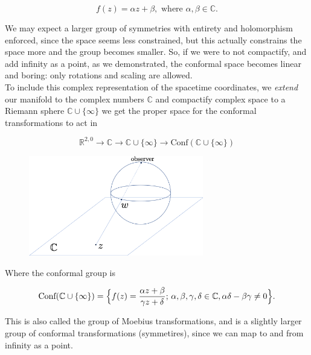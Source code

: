 \begin{equation}
f(z) = \alpha z + \beta, \text{ where } \alpha, \beta \in \mathbb{C}.
\end{equation}

\noindent We may expect a larger group of symmetries with entirety and holomorphism enforced, since the space seems less constrained, but this actually constrains the space more and the group becomes smaller. So, if we were to not compactify, and add infinity as a point, as we demonstrated, the conformal space becomes linear and boring: only rotations and scaling are allowed.\\

\noindent To include this complex representation of the spacetime coordinates, we \textit{extend} our manifold to the complex numbers $\mathbb{C}$ and compactify complex space to a Riemann sphere $\mathbb{C} \cup \{ \infty \}$ we get the proper space for the conformal transformations to act in

\begin{equation}
\mathbb{R}^{2,0} \rightarrow \mathbb{C} \rightarrow \mathbb{C} \cup \{\infty\} \rightarrow \text{Conf}(\mathbb{C} \cup \{\infty\} )
\end{equation}

\begin{figure}[H]
	\centering
	\includegraphics[width=3in]{images/riemann_sphere.png} 
\end{figure} 

\noindent Where the conformal group is

\begin{equation}
\text{Conf}(\mathbb{C} \cup \{ \infty \} ) = \Big{\{} f(z) = \frac{\alpha z + \beta}{\gamma z + \delta}; \, \alpha, \beta, \gamma, \delta \in \mathbb{C}, \alpha\delta - \beta \gamma \ne 0 \Big{\}}.
\end{equation}

\noindent This is also called the group of Moebius transformations, and is a slightly larger group of conformal transformations (symmetires), since we can map to and from infinity as a point. \\

